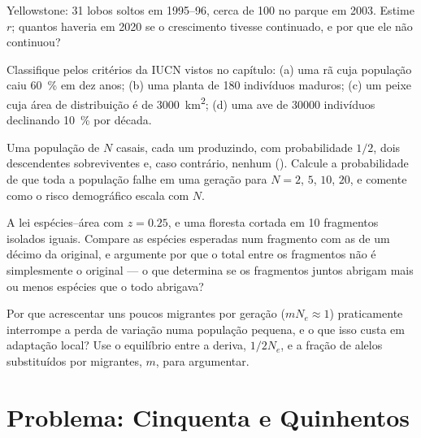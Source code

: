 \begin{exercise}[$\star\star$]\label{exo:b3:conservation-biology:8}
Yellowstone: 31 lobos soltos em 1995--96, cerca de 100 no parque em 2003.
Estime $r$; quantos haveria em 2020 se o crescimento tivesse continuado,
e por que ele não continuou?
\end{exercise}

\begin{exercise}[$\star\star$]\label{exo:b3:conservation-biology:9}
Classifique pelos critérios da IUCN vistos no capítulo: (a) uma rã cuja
população caiu \qty{60}{\%} em dez anos; (b) uma planta de 180 indivíduos
maduros; (c) um peixe cuja área de distribuição é de \qty{3000}{km^2};
(d) uma ave de \num{30000} indivíduos declinando \qty{10}{\%} por
década.
\end{exercise}

\begin{exercise}[$\star\star\star$]\label{exo:b3:conservation-biology:10}
Uma população de $N$ casais, cada um produzindo, com probabilidade $1/2$,
dois descendentes sobreviventes e, caso contrário, nenhum
(). Calcule a probabilidade de que toda a
população falhe em uma geração para $N = 2$, $5$, $10$, $20$, e comente
como o risco demográfico escala com $N$.
\end{exercise}

\begin{exercise}[$\star\star\star$]\label{exo:b3:conservation-biology:11}
A lei espécies--área com $z = 0.25$, e uma floresta cortada em 10
fragmentos isolados iguais. Compare as espécies esperadas num fragmento
com as de um décimo da original, e argumente por que o total entre os
fragmentos não é simplesmente o original --- o que determina se os
fragmentos juntos abrigam mais ou menos espécies que o todo abrigava?
\end{exercise}

\begin{exercise}[$\star\star\star$]\label{exo:b3:conservation-biology:12}
Por que acrescentar uns poucos migrantes por geração ($m N_{e} \approx 1$) praticamente interrompe a perda de variação numa população pequena, e
o que isso custa em adaptação local? Use o equilíbrio entre a deriva,
$1/2N_{e}$, e a fração de alelos substituídos por migrantes, $m$, para
argumentar.
\end{exercise}

\section{Problema: Cinquenta e Quinhentos}


